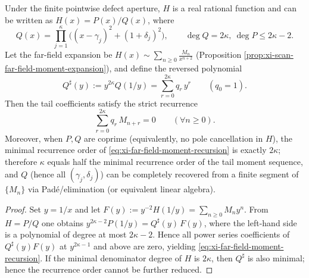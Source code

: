 \begin{proposition}\label{prop:xi-far-field-moment-recursion-order-2kappa}
Under the finite pointwise defect aperture, \(H\) is a real rational function and can be written as \(H(x)=P(x)/Q(x)\), where
\[
Q(x)=\prod_{j=1}^{\kappa}\bigl((x-\gamma_j)^2+(1+\delta_j)^2\bigr),
\qquad \deg Q=2\kappa,\ \deg P\le 2\kappa-2.
\]
Let the far-field expansion be \(H(x)\sim\sum_{n\ge 0}\frac{M_n}{x^{n+2}}\) (Proposition \ref{prop:xi-scan-far-field-moment-expansion}), and define the reversed polynomial
\begin{equation}\label{eq:xi-Qsharp-from-Q}
\boxed{\;
Q^\sharp(y):=y^{2\kappa}Q(1/y)=\sum_{r=0}^{2\kappa}q_r\,y^{r}\qquad(q_0=1).\;}
\end{equation}
Then the tail coefficients satisfy the strict recurrence
\begin{equation}\label{eq:xi-far-field-moment-recursion}
\boxed{\;
\sum_{r=0}^{2\kappa} q_r\,M_{n+r}=0\qquad(\forall n\ge 0).\;}
\end{equation}
Moreover, when \(P,Q\) are coprime (equivalently, no pole cancellation in \(H\)), the minimal recurrence order of \eqref{eq:xi-far-field-moment-recursion} is exactly \(2\kappa\);
therefore \(\kappa\) equals half the minimal recurrence order of the tail moment sequence, and \(Q\) (hence all \((\gamma_j,\delta_j)\)) can be completely recovered from a finite segment of \(\{M_n\}\) via Pad\'e/elimination (or equivalent linear algebra).
\end{proposition}

\begin{proof}
Set \(y=1/x\) and let
\(
F(y):=y^{-2}H(1/y)=\sum_{n\ge 0}M_ny^n
\).
From \(H=P/Q\) one obtains
\(
y^{2\kappa-2}P(1/y)=Q^\sharp(y)\,F(y)
\), where the left-hand side is a polynomial of degree at most \(2\kappa-2\).
Hence all power series coefficients of \(Q^\sharp(y)F(y)\) at \(y^{2\kappa-1}\) and above are zero, yielding \eqref{eq:xi-far-field-moment-recursion}.
If the minimal denominator degree of \(H\) is \(2\kappa\), then \(Q^\sharp\) is also minimal; hence the recurrence order cannot be further reduced. \qedhere
\end{proof}

